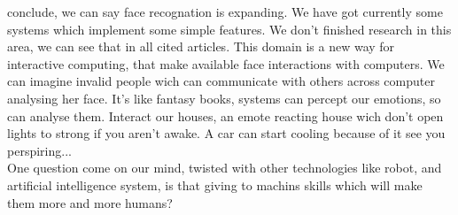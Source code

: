  conclude, we can say face recognation is expanding. We have got currently some systems which implement some simple features. We don't finished research in this area, we can see that in all cited articles. This domain is a new way for interactive computing, that make available face interactions with computers. We can imagine invalid people wich can communicate with others across computer analysing her face. It's like fantasy books, systems can percept our emotions, so can analyse them. Interact our houses, an emote reacting house wich don't open lights to strong if you aren't awake. A car can start cooling because of it see you perspiring...\\
One question come on our mind, twisted with other technologies like robot, and artificial intelligence system, is that giving to machins skills which will make them more and more humans?\\
